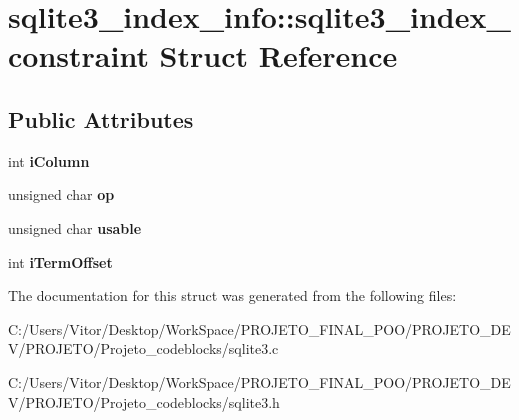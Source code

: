\hypertarget{structsqlite3__index__info_1_1sqlite3__index__constraint}{\section{sqlite3\-\_\-index\-\_\-info\-:\-:sqlite3\-\_\-index\-\_\-constraint Struct Reference}
\label{structsqlite3__index__info_1_1sqlite3__index__constraint}
}
\subsection*{Public Attributes}
\begin{DoxyCompactItemize}
\item 
\hypertarget{structsqlite3__index__info_1_1sqlite3__index__constraint_a0f1e207060420058ee2881f2ea368e3a}{int {\bfseries i\-Column}}\label{structsqlite3__index__info_1_1sqlite3__index__constraint_a0f1e207060420058ee2881f2ea368e3a}

\item 
\hypertarget{structsqlite3__index__info_1_1sqlite3__index__constraint_a362f4ec1f71975cb0ac39a8b5e4b1476}{unsigned char {\bfseries op}}\label{structsqlite3__index__info_1_1sqlite3__index__constraint_a362f4ec1f71975cb0ac39a8b5e4b1476}

\item 
\hypertarget{structsqlite3__index__info_1_1sqlite3__index__constraint_ae16e62caeab743cc68bb22227dacb501}{unsigned char {\bfseries usable}}\label{structsqlite3__index__info_1_1sqlite3__index__constraint_ae16e62caeab743cc68bb22227dacb501}

\item 
\hypertarget{structsqlite3__index__info_1_1sqlite3__index__constraint_a4e8368da66f34b7f07b369984b813d1b}{int {\bfseries i\-Term\-Offset}}\label{structsqlite3__index__info_1_1sqlite3__index__constraint_a4e8368da66f34b7f07b369984b813d1b}

\end{DoxyCompactItemize}


The documentation for this struct was generated from the following files\-:\begin{DoxyCompactItemize}
\item 
C\-:/\-Users/\-Vitor/\-Desktop/\-Work\-Space/\-P\-R\-O\-J\-E\-T\-O\-\_\-\-F\-I\-N\-A\-L\-\_\-\-P\-O\-O/\-P\-R\-O\-J\-E\-T\-O\-\_\-\-D\-E\-V/\-P\-R\-O\-J\-E\-T\-O/\-Projeto\-\_\-codeblocks/sqlite3.\-c\item 
C\-:/\-Users/\-Vitor/\-Desktop/\-Work\-Space/\-P\-R\-O\-J\-E\-T\-O\-\_\-\-F\-I\-N\-A\-L\-\_\-\-P\-O\-O/\-P\-R\-O\-J\-E\-T\-O\-\_\-\-D\-E\-V/\-P\-R\-O\-J\-E\-T\-O/\-Projeto\-\_\-codeblocks/sqlite3.\-h\end{DoxyCompactItemize}
